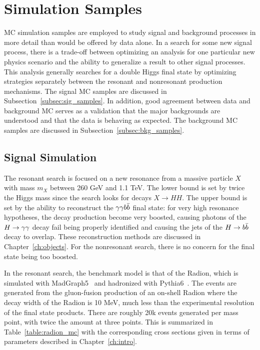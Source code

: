 \section{Simulation Samples\label{sec:sim}}


MC simulation samples are employed to study signal and background processes in more detail
than would be offered by data alone. In a search for some new signal process, there is a trade-off
between optimizing an analysis for one particular new physics scenario and the ability to
generalize a result to other signal processes. This analysis generally searches for a double Higgs final
state by optimizing strategies separately between the resonant and nonresonant production mechanisms.
The signal MC samples are discussed in Subsection~\ref{subsec:sig_samples}.
In addition, good agreement between data
and background MC serves as a validation that the major backgrounds are understood and that
the data is behaving as expected. The background MC samples are discussed in
Subsection~\ref{subsec:bkg_samples}.

\subsection{Signal Simulation\label{subsec:sig_samples}}

The resonant search is focused on a new resonance from a massive particle $X$ with mass $m_X$ between
260 GeV and 1.1 TeV. The lower bound is set by twice the Higgs mass since the search looks for decays
$X\rightarrow HH$. The upper bound is set by the ability to reconstruct the $\gamma\gamma b\bar{b}$ final state: for
very high resonance hypotheses, the decay production become very boosted, causing photons of the
$H\to\gamma\gamma$ decay fail being properly identified and causing the jets of the $H\to b\bar{b}$ decay to overlap.
These reconstruction methods are discussed in Chapter~\ref{ch:objects}. For the nonresonant
search, there is no concern for the final state being too boosted.

In the resonant search, the benchmark model is that of the Radion, which is simulated with
MadGraph5~\cite{Madgraph_Alwall:2011uj} and hadronized with Pythia6~\cite{Pythia6-0}. The events are
generated from the gluon-fusion production of an on-shell Radion where the decay width of the Radion
is 10 MeV, much less than the experimental resolution of the final state products. There are roughly
20k events generated per mass point, with twice the amount at three points.
This is summarized in Table~\ref{table:radion_mc} with the corresponding cross sections given in terms
of parameters described in Chapter~\ref{ch:intro}.


